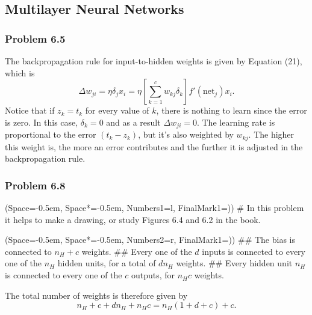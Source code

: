 \documentclass[12pt, a4paper]{article}
\newcommand{\listSpace}{-0.5em}%
\begin{document}
{\clearpage
\subsection{Multilayer Neural Networks}

\subsubsection*{Problem 6.5}
The backpropagation rule for input-to-hidden weights is given by Equation (21), which is
\begin{equation*}
	\Delta w_{ji} =
	\eta \delta_j x_i = 
	\eta \left[ \sum_{k=1}^{c} w_{kj} \delta_k \right] f'(\text{net}_j) x_i.
\end{equation*}
Notice that if $z_k = t_k$ for every value of $k$, there is nothing to learn since the error is zero.
In this case, $\delta_k = 0$ and as a result $\Delta w_{ji} = 0$.
The learning rate is proportional to the error $(t_k - z_k)$, but it's also weighted by $w_{kj}$.
The higher this weight is, the more an error contributes and the further it is adjusted in the backpropagation rule.



\subsubsection*{Problem 6.8}
\begin{easylist}[enumerate]
\ListProperties(Space=\listSpace, Space*=\listSpace, Numbers1=l, FinalMark1={)})
# In this problem it helps to make a drawing, or study Figures 6.4 and 6.2 in the book.

\begin{easylist}
	\ListProperties(Space=\listSpace, Space*=\listSpace, Numbers2=r, FinalMark1={)})
## The bias is connected to $n_H + c$ weights.
## Every one of the $d$ inputs is connected to every one of the $n_H$ hidden units, for a total of $d n_H$ weights.
## Every hidden unit $n_H$ is connected to every one of the $c$ outputs, for $n_H c$ weights. 
\end{easylist}



The total number of weights is therefore given by
\begin{equation*}
	n_H + c + d n_H  +n_H c = n_H (1 + d + c) + c.
\end{equation*}


\end{easylist}}
\end{document}
